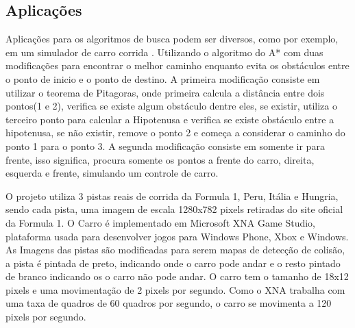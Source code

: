 \begin{minipage}{\linewidth}
\end{minipage}

\subsection{Aplicações}
Aplicações para os algoritmos de busca podem ser diversos, como por exemplo, em um simulador de carro corrida \cite{JungTing}. Utilizando o algoritmo do A* com duas modificações para encontrar o melhor caminho enquanto evita os obstáculos entre o ponto de inicio e o ponto de destino. 
A primeira modificação consiste em utilizar o teorema de Pitagoras, onde primeira calcula a distância entre dois pontos(1 e 2), verifica se existe algum obstáculo dentre eles, se existir, utiliza o terceiro ponto para calcular a Hipotenusa e verifica se existe obstáculo entre a hipotenusa, se não existir, remove o ponto 2 e começa a considerar o caminho do ponto 1 para o ponto 3. A segunda modificação consiste em somente ir para frente, isso significa, procura somente os pontos a frente do carro, direita, esquerda e frente, simulando um controle de carro.

O projeto utiliza 3 pistas reais de corrida da Formula 1, Peru, Itália e Hungria, sendo cada pista, uma imagem de escala 1280x782 pixels retiradas do site oficial da Formula 1. O Carro é implementado em Microsoft XNA Game Studio, plataforma usada para desenvolver jogos para Windows Phone, Xbox e Windows. As Imagens das pistas são modificadas para serem mapas de detecção de colisão, a pista é pintada de preto, indicando onde o carro pode andar e o resto pintado de branco indicando os o carro não pode andar. O carro tem o tamanho de 18x12 pixels e uma movimentação de 2 pixels por segundo. Como o XNA trabalha com uma taxa de quadros de 60 quadros por segundo, o carro se movimenta a 120 pixels por segundo.

